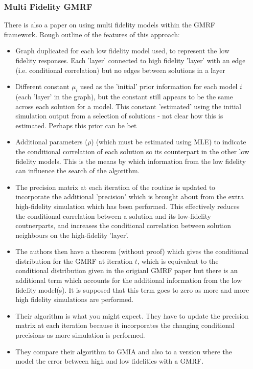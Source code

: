 \documentclass{article}
\begin{document}
\subsubsection{Multi Fidelity GMRF}

There is also a paper on using multi fidelity models within the GMRF framework. Rough outline of the features of this approach:

\begin{itemize}
\item Graph duplicated for each low fidelity model used, to represent the low fidelity responses. Each 'layer' connected to high fidelity 'layer' with an edge (i.e. conditional correlation) but no edges between solutions in a layer 
\item Different constant $\mu_i$ used as the 'initial' prior information for each model $i$ (each 'layer' in the graph), but the constant still appears to be the same across each solution for a model. This constant 'estimated' using the initial simulation output from a selection of solutions - not clear how this is estimated. Perhaps this prior can be bet
\item Additional parameters ($\rho$) (which must be estimated using MLE) to indicate the conditional correlation of each solution so its counterpart in the other low fidelity models. This is the means by which information from the low fidelity can influence the search of the algorithm.
\item The precision matrix at each iteration of the routine is updated to incorporate the additional 'precision' which is brought about from the extra high-fidelity simulation which has been performed. This effectively reduces the conditional correlation between a solution and its low-fidelity coutnerparts, and increases the conditional correlation between solution neighbours on the high-fidelity 'layer'.
\item The authors then have a theorem (without proof) which gives the conditional distribution for the GMRF at iteration $t$, which is equivalent to the conditional distribution given in the origianl GMRF paper but there is an additional term which accounts for the additional information from the low fidelity model(s). It is supposed that this term goes to zero as more and more high fidelity simulations are performed.
\item Their algorithm is what you might expect. They have to update the precision matrix at each iteration because it incorporates the changing conditional precisions as more simulation is performed.
\item They compare their algorithm to GMIA and also to a version where the model the error between high and low fidelities with a GMRF.
\end{itemize}
\end{document}
